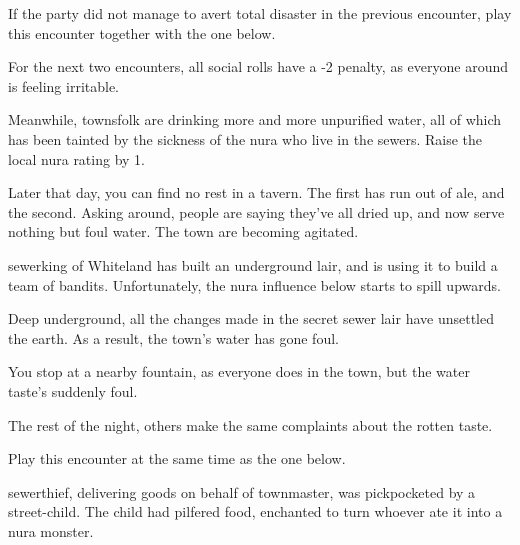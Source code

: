 \begin{multicols}{2}

If the party did not manage to avert total disaster in the previous encounter, play this encounter together with the one below.

For the next two encounters, all social rolls have a -2 penalty, as everyone around is feeling irritable.

Meanwhile, townsfolk are drinking more and more unpurified water, all of which has been tainted by the sickness of the nura who live in the sewers.  Raise the local nura rating by 1.

\begin{boxtext}

	Later that day, you can find no rest in a tavern.  The first has run out of ale, and the second.  Asking around, people are saying they've all dried up, and now serve nothing but foul water.  The town are becoming agitated.

\end{boxtext}

\stopcontents[sq]

\label{sewerbandits}

\startcontents[sq]

\sqminitoc

\Gls{sewerking} of Whiteland has built an underground lair, and is using it to build a team of bandits.
Unfortunately, the nura influence below starts to spill upwards.


Deep underground, all the changes made in the secret sewer lair have unsettled the earth.
As a result, the town's water has gone foul.

\begin{boxtext}

	You stop at a nearby fountain, as everyone does in the town, but the water taste's suddenly foul.

	The rest of the night, others make the same complaints about the rotten taste.

\end{boxtext}

Play this encounter at the same time as the one below.


\Gls{sewerthief}, delivering goods on behalf of \gls{townmaster}, was pickpocketed by a street-child.
The child had pilfered food, enchanted to turn whoever ate it into a nura monster.


\end{multicols}
